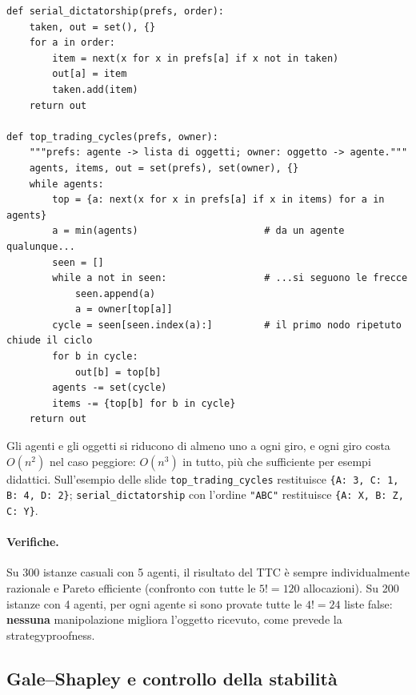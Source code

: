\begin{lstlisting}
def serial_dictatorship(prefs, order):
    taken, out = set(), {}
    for a in order:
        item = next(x for x in prefs[a] if x not in taken)
        out[a] = item
        taken.add(item)
    return out

def top_trading_cycles(prefs, owner):
    """prefs: agente -> lista di oggetti; owner: oggetto -> agente."""
    agents, items, out = set(prefs), set(owner), {}
    while agents:
        top = {a: next(x for x in prefs[a] if x in items) for a in agents}
        a = min(agents)                      # da un agente qualunque...
        seen = []
        while a not in seen:                 # ...si seguono le frecce
            seen.append(a)
            a = owner[top[a]]
        cycle = seen[seen.index(a):]         # il primo nodo ripetuto chiude il ciclo
        for b in cycle:
            out[b] = top[b]
        agents -= set(cycle)
        items -= {top[b] for b in cycle}
    return out
\end{lstlisting}
Gli agenti e gli oggetti si riducono di almeno uno a ogni giro, e ogni giro costa
$O(n^2)$ nel caso peggiore: $O(n^3)$ in tutto, più che sufficiente per esempi didattici.
Sull'esempio delle slide \texttt{top\_trading\_cycles} restituisce
\texttt{\{A: 3, C: 1, B: 4, D: 2\}}; \texttt{serial\_dictatorship} con l'ordine
\texttt{"ABC"} restituisce \texttt{\{A: X, B: Z, C: Y\}}.

\paragraph{Verifiche.} Su 300 istanze casuali con 5 agenti, il risultato del TTC è sempre
individualmente razionale e Pareto efficiente (confronto con tutte le $5! = 120$
allocazioni). Su 200 istanze con 4 agenti, per ogni agente si sono provate tutte le
$4! = 24$ liste false: \textbf{nessuna} manipolazione migliora l'oggetto ricevuto, come
prevede la strategyproofness.

\subsection{Gale--Shapley e controllo della stabilità}

